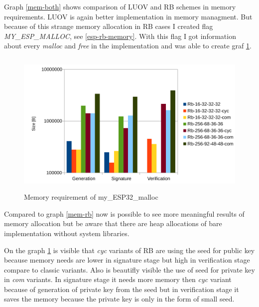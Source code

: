 \documentclass[thesis=M,english]{FITthesis}[2019/12/23]
\begin{document}
\noindent
Graph \ref{mem-both} shows comparison of LUOV and RB schemes in memory requirements. LUOV is again better implementation in memory managment. But because of this strange memory allocation in RB cases I created flag \textit{MY\_ESP\_MALLOC}, see \ref{esp-rb-memory}. With this flag I got information about every \textit{malloc} and \textit{free} in the implementation and was able to create graf \ref{mem-my-alloc}.

\begin{figure}[H]
\centering
\includegraphics[width=13cm,height=7cm]{images/mem-my_esp_malloc.pdf}
\caption{Memory requirement of my\_ESP32\_malloc}
\label{mem-my-alloc}
\end{figure}

\noindent
Compared to graph \ref{mem-rb} now is possible to see more meaningful results of memory allocation but be aware that there are heap allocations of bare implementation without system libraries.

\bigskip
\noindent
On the graph \ref{mem-my-alloc} is visible that \textit{cyc} variants of RB are using the seed for public key because memory needs are lower in signature stage but high in verification stage compare to classic variants. Also is beautifly visible the use of seed for private key in \textit{com} variants. In signature stage it needs more memory then \textit{cyc} variant because of generation of private key from the seed but in verification stage it saves the memory because the private key is only in the form of small seed.

\end{document}
